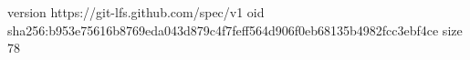 version https://git-lfs.github.com/spec/v1
oid sha256:b953e75616b8769eda043d879c4f7feff564d906f0eb68135b4982fcc3ebf4ce
size 78
